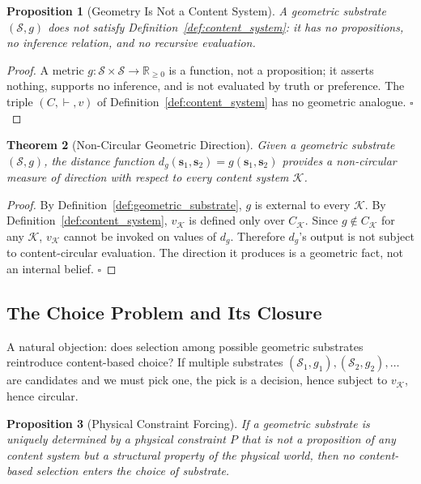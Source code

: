 \documentclass[11pt,twocolumn,a4paper]{article}
\newtheorem{theorem}{Theorem}[section]
\newtheorem{proposition}[theorem]{Proposition}
\begin{document}
\begin{proposition}[Geometry Is Not a Content System]
\label{prop:geometry_not_content}
A geometric substrate $(\mathcal{S}, g)$ does not satisfy Definition~\ref{def:content_system}: it has no propositions, no inference relation, and no recursive evaluation.
\end{proposition}

\begin{proof}
A metric $g: \mathcal{S} \times \mathcal{S} \to \mathbb{R}_{\geq 0}$ is a function, not a proposition; it asserts nothing, supports no inference, and is not evaluated by truth or preference. The triple $(C, \vdash, v)$ of Definition~\ref{def:content_system} has no geometric analogue. $\square$
\end{proof}

\begin{theorem}[Non-Circular Geometric Direction]
\label{thm:geometric_direction}
Given a geometric substrate $(\mathcal{S}, g)$, the distance function $d_g(\mathbf{s}_1, \mathbf{s}_2) = g(\mathbf{s}_1, \mathbf{s}_2)$ provides a non-circular measure of direction with respect to every content system $\mathcal{K}$.
\end{theorem}

\begin{proof}
By Definition~\ref{def:geometric_substrate}, $g$ is external to every $\mathcal{K}$. By Definition~\ref{def:content_system}, $v_\mathcal{K}$ is defined only over $C_\mathcal{K}$. Since $g \notin C_\mathcal{K}$ for any $\mathcal{K}$, $v_\mathcal{K}$ cannot be invoked on values of $d_g$. Therefore $d_g$'s output is not subject to content-circular evaluation. The direction it produces is a geometric fact, not an internal belief. $\square$
\end{proof}

\subsection{The Choice Problem and Its Closure}

A natural objection: does selection among possible geometric substrates reintroduce content-based choice? If multiple substrates $(\mathcal{S}_1, g_1), (\mathcal{S}_2, g_2), \ldots$ are candidates and we must pick one, the pick is a decision, hence subject to $v_\mathcal{K}$, hence circular.

\begin{proposition}[Physical Constraint Forcing]
\label{prop:constraint_forcing}
If a geometric substrate is uniquely determined by a physical constraint $P$ that is not a proposition of any content system but a structural property of the physical world, then no content-based selection enters the choice of substrate.
\end{proposition}
\end{document}

